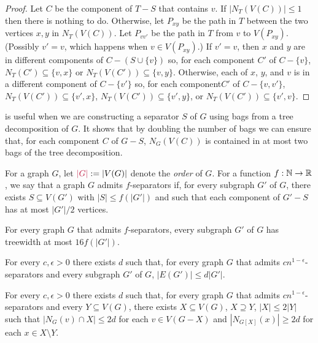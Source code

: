 \documentclass{patmorin}
\makeatletter
\renewcommand{\ge}{\geqslant}
\renewcommand{\le}{\leqslant}
\newcommand{\defin}[1]{\emph{\textcolor{brightmaroon}{#1}}}
\def\mathcolor#1#{\@mathcolor{#1}}
\def\@mathcolor#1#2#3{%
  \protect\leavevmode
  \begingroup
    \color#1{#2}#3%
  \endgroup
}
\newcommand{\mathdefin}[1]{\mathcolor{brightmaroon}{#1}}
\makeatother
\begin{document}
\begin{proof}
  Let $C$ be the component of $T-S$ that contains $v$. If $|N_T(V(C))|\le 1$ then there is nothing to do.  Otherwise, let $P_{xy}$ be the path in $T$ between the two vertices $x,y$ in $N_T(V(C))$.  Let $P_{vv'}$ be the path in $T$ from $v$ to $V(P_{xy})$.  (Possibly $v'=v$, which happens when $v\in V(P_{xy})$.)  If $v'=v$, then $x$ and $y$ are in different components of $C-(S\cup\{v\})$ so, for each component $C'$ of $C-\{v\}$, $N_T(C')\subseteq\{v,x\}$ or $N_T(V(C'))\subseteq\{v,y\}$.  Otherwise, each of $x$, $y$, and $v$ is in a different component of $C-\{v'\}$ so, for each component$C'$ of $C-\{v,v'\}$, $N_T(V(C'))\subseteq\{v',x\}$, $N_T(V(C'))\subseteq\{v',y\}$, or $N_T(V(C'))\subseteq\{v',v\}$.
\end{proof}

 is useful when we are constructing a separator $S$ of $G$ using bags from a tree decomposition of $G$.  It shows that by doubling the number of bags we can ensure that, for each component $C$ of $G-S$, $N_G(V(C))$ is contained in at most two bags of the tree decomposition.





For a graph $G$, let $\mathdefin{|G|}:=|V(G)|$ denote the \defin{order} of $G$.  For a function $f:\mathbb{N}\to\mathbb{R}$, we say that a graph $G$ admits $f$-separators if, for every subgraph $G'$ of $G$, there exists $S\subseteq V(G')$ with $|S|\le f(|G'|)$ and such that each component of $G'-S$ has at most $|G'|/2$ vertices.

\begin{thm}\label{dvorak_norin}
  For every graph $G$ that admits $f$-separators, every subgraph $G'$ of $G$ has treewidth at most $16f(|G'|)$.
\end{thm}

\begin{thm}[??]\label{density_bound}
  For every $c,\epsilon >0$ there exists $d$ such that, for every graph $G$ that admits $cn^{1-\epsilon}$-separators and every subgraph $G'$ of $G$, $|E(G')|\le d|G'|$.
\end{thm}

\begin{lem}\label{degree_bounder}
  For every $c,\epsilon >0$ there exists $d$ such that, for every graph $G$ that admits $cn^{1-\epsilon}$-separators and every $Y\subseteq V(G)$, there exists $X\subseteq V(G)$, $X\supseteq Y$, $|X|\le 2|Y|$ such that $|N_G(v)\cap X|\le 2d$ for each $v\in V(G-X)$ and $|N_{G[X]}(x)|\ge 2d$ for each $x\in X\setminus Y$.
\end{lem}
\end{document}
